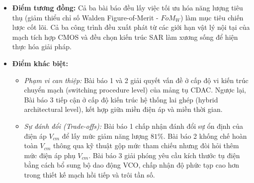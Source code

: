 \documentclass[12pt,a4paper]{article}
\begin{document}
\begin{itemize}
    \item \textbf{Điểm tương đồng:} Cả ba bài báo đều lấy việc tối ưu hóa năng lượng tiêu thụ (giảm thiểu chỉ số Walden Figure-of-Merit - $FoM_W$) làm mục tiêu chiến lược cốt lõi. Cả ba công trình đều xuất phát từ các giới hạn vật lý nội tại của mạch tích hợp CMOS và đều chọn kiến trúc SAR làm xương sống để hiện thực hóa giải pháp.
    \item \textbf{Điểm khác biệt:} 
    \begin{itemize}
        \item \textit{Phạm vi can thiệp:} Bài báo 1 và 2 giải quyết vấn đề ở cấp độ vi kiến trúc chuyển mạch (switching procedure level) của mảng tụ CDAC. Ngược lại, Bài báo 3 tiếp cận ở cấp độ kiến trúc hệ thống lai ghép (hybrid architectural level), kết hợp giữa miền điện áp và miền thời gian.
        \item \textit{Sự đánh đổi (Trade-offs):} Bài báo 1 chấp nhận đánh đổi sự ổn định của điện áp $V_{cm}$ để lấy mức giảm năng lượng $81\%$. Bài báo 2 khống chế hoàn toàn $V_{cm}$ thông qua kỹ thuật gộp mức tham chiếu nhưng đòi hỏi thêm mức điện áp phụ $V_{cm}$. Bài báo 3 giải phóng yêu cầu kích thước tụ điện bằng cách bổ sung bộ dao động VCO, chấp nhận độ phức tạp cao hơn trong thiết kế mạch hồi tiếp và trôi tần số.
    \end{itemize}
\end{itemize}
\end{document}
